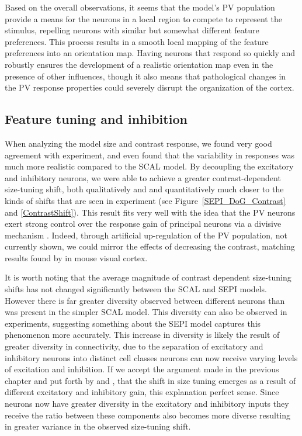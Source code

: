 Based on the overall observations, it seems that the model's PV
population provide a means for the neurons in a local region to
compete to represent the stimulus, repelling neurons with similar but
somewhat different feature preferences.  This process results in a
smooth local mapping of the feature preferences into an orientation
map. Having neurons that respond so quickly and robustly ensures the
development of a realistic orientation map even in the presence of
other influences, though it also means that pathological changes in
the PV response properties could severely disrupt the organization of
the cortex.

\subsection{Feature tuning and inhibition}

When analyzing the model size and contrast response, we found very
good agreement with experiment, and even found that the variability in
responses was much more realistic compared to the SCAL model. By
decoupling the excitatory and inhibitory neurons, we were able to
achieve a greater contrast-dependent size-tuning shift, both
qualitatively and and quantitatively much closer to the kinds of
shifts that are seen in experiment (see Figure~\ref{SEPI_DoG_Contrast}
and \ref{ContrastShift}). This result fits very well with the idea
that the PV neurons exert strong control over the response gain of
principal neurons via a divisive mechanism \citep{Wilson2012}. Indeed,
through artificial up-regulation of the PV population, not currently
shown, we could mirror the effects of decreasing the contrast,
matching results found by \cite{Nienborg2013} in mouse visual cortex.

It is worth noting that the average magnitude of contrast dependent
size-tuning shifts has not changed significantly between the SCAL and
SEPI models. However there is far greater diversity observed between
different neurons than was present in the simpler SCAL model. This
diversity can also be observed in experiments, suggesting something
about the SEPI model captures this phenomenon more accurately. This
increase in diversity is likely the result of greater diversity in
connectivity, due to the separation of excitatory and inhibitory
neurons into distinct cell classes neurons can now receive varying
levels of excitation and inhibition. If we accept the argument made in
the previous chapter and put forth by \cite{Cavanaugh2002} and
\cite{Solomon2006}, that the shift in size tuning emerges as a result
of different excitatory and inhibitory gain, this explanation perfect
sense. Since neurons now have greater diversity in the excitatory and
inhibitory inputs they receive the ratio between these components also
becomes more diverse resulting in greater variance in the observed
size-tuning shift.

